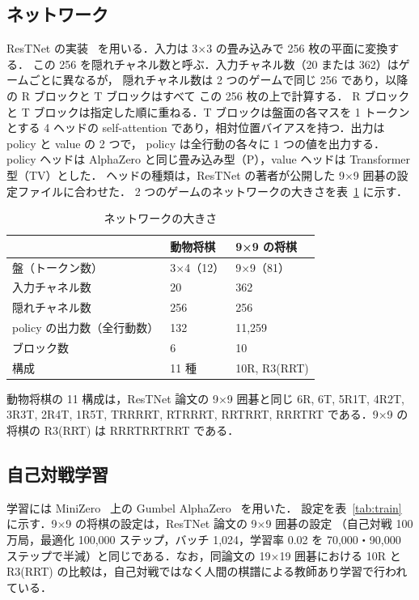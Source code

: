 \documentclass[a4paper,10pt,twocolumn]{ltjsarticle}
\begin{document}
\subsection{ネットワーク}
ResTNet の実装~\cite{restnet} を用いる．入力は 3×3 の畳み込みで 256 枚の平面に変換する．
この 256 を隠れチャネル数と呼ぶ．入力チャネル数（20 または 362）はゲームごとに異なるが，
隠れチャネル数は 2 つのゲームで同じ 256 であり，以降の R ブロックと T ブロックはすべて
この 256 枚の上で計算する．
R ブロックと T ブロックは指定した順に重ねる．T ブロックは盤面の各マスを 1 トークンとする
4 ヘッドの self-attention であり，相対位置バイアスを持つ．出力は policy と value の 2 つで，
policy は全行動の各々に 1 つの値を出力する．
policy ヘッドは AlphaZero と同じ畳み込み型（P），value ヘッドは Transformer 型（TV）とした．
ヘッドの種類は，ResTNet の著者が公開した 9×9 囲碁の設定ファイルに合わせた．
2 つのゲームのネットワークの大きさを表~\ref{tab:net} に示す．

\begin{table}[htbp]
  \centering\footnotesize
  \caption{ネットワークの大きさ}
  \label{tab:net}
  \begin{tabular}{lll}
    \toprule
    & 動物将棋 & 9×9 の将棋 \\
    \midrule
    盤（トークン数） & 3×4（12） & 9×9（81） \\
    入力チャネル数 & 20 & 362 \\
    隠れチャネル数 & 256 & 256 \\
    policy の出力数（全行動数） & 132 & 11,259 \\
    ブロック数 & 6 & 10 \\
    構成 & 11 種 & 10R, R3(RRT) \\
    \bottomrule
  \end{tabular}
\end{table}

動物将棋の 11 構成は，ResTNet 論文の 9×9 囲碁と同じ 6R, 6T, 5R1T, 4R2T, 3R3T,
2R4T, 1R5T, TRRRRT, RTRRRT, RRTRRT, RRRTRT である．9×9 の将棋の R3(RRT) は
RRRTRRTRRT である．

\subsection{自己対戦学習}
学習には MiniZero~\cite{minizero} 上の Gumbel AlphaZero~\cite{gumbel} を用いた．
設定を表~\ref{tab:train} に示す．9×9 の将棋の設定は，ResTNet 論文の 9×9 囲碁の設定
（自己対戦 100 万局，最適化 100,000 ステップ，バッチ 1,024，学習率 0.02 を
70,000・90,000 ステップで半減）と同じである．なお，同論文の 19×19 囲碁における 10R と
R3(RRT) の比較は，自己対戦ではなく人間の棋譜による教師あり学習で行われている．
\end{document}

